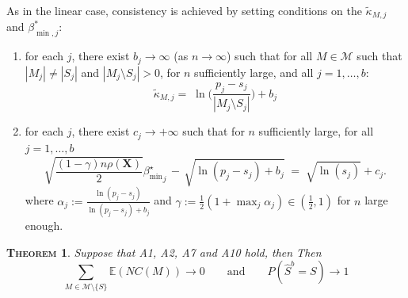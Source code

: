 \documentclass[aos]{imsart}
\theoremstyle{plain}
\newtheorem{thm}{\textsc{Theorem}}[section]
\newcommand{\E}{\mathbb{E}}
\newcommand{\M}{\mathcal{M}}
\newcommand{\bs}{\boldsymbol}
\begin{document}
As in the linear case, consistency is achieved by setting conditions on the $\tilde{\kappa}_{M, j}$ and $\beta^*_{\min, j}$:
\begin{enumerate}[start=9,label={(A\arabic*)}]
    \item for each $j$, there exist $b_{j}\to \infty$ (as $n\to \infty$) such that for all $M \in \M$ such that $|M_j| \neq |S_j|$ and $|M_j \setminus S_j| >0$, for $n$ sufficiently large, and  all $j=1,\ldots,b$:
\begin{equation}\label{cond:suffIregnonlinpen}
    \tilde{\kappa}_{M, j} =\;\ln\bigg(\frac{p_j-s_j}{|M_j \setminus S_j| }\bigg) + b_{j}
\end{equation}

\item  for each $j$, there exist $c_{j}\to +\infty$ such that for $n$ sufficiently large, for all $j=1,\ldots,b$
    \begin{equation}\label{cond:suffIIregnonlinpen}
        \sqrt{\frac{(1-\gamma) n\rho(\bs X)}{2}}{{\beta_{\min}^{\star}}_j} \,- \,\sqrt{\ln(p_j-s_j) + b_{j}} \;=\; \sqrt{\ln(s_j)} + c_{j} .
    \end{equation}
where $\alpha_j:=\frac{\ln(p_j-s_j)}{\ln(p_j-s_j) + b_{j}}$ and $\gamma:=\frac12(1+\max_j \alpha_j)\in (\tfrac12,1)$ for $n$ large enough.
\end{enumerate}
\begin{thm}\label{theo:suffcondlinearmodelnonlinpen}
Suppose that A1, A2, A7 and A10 hold, then 
Then $$\sum_{M \in \M\setminus \{S\}}\E\left(NC(M)\right)\to 0 \qquad \mbox{and} \qquad P(\widehat{S}^b = S) \to 1$$
\end{thm}
\end{document}
